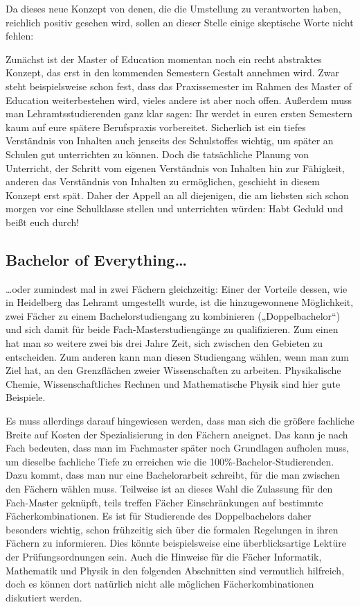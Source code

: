 Da dieses neue Konzept von denen, die die Umstellung zu verantworten haben,
reichlich positiv gesehen wird, sollen an dieser Stelle einige skeptische Worte
nicht fehlen:

Zunächst ist der Master of Education momentan noch ein recht abstraktes
Konzept, das erst in den kommenden Semestern Gestalt annehmen wird. Zwar steht
beispielsweise schon fest, dass das Praxissemester im Rahmen des Master of
Education weiterbestehen wird, vieles andere ist aber noch offen. Außerdem muss
man Lehramtsstudierenden ganz klar sagen: Ihr werdet in euren ersten Semestern
kaum auf eure spätere Berufspraxis vorbereitet. Sicherlich ist ein tiefes
Verständnis von Inhalten auch jenseits des Schulstoffes wichtig, um später an
Schulen gut unterrichten zu können. Doch die tatsächliche Planung von
Unterricht, der Schritt vom eigenen Verständnis von Inhalten hin zur Fähigkeit,
anderen das Verständnis von Inhalten zu ermöglichen, geschieht in diesem
Konzept erst spät. Daher der Appell an all diejenigen, die am liebsten sich
schon morgen vor eine Schulklasse stellen und unterrichten würden: Habt Geduld
und beißt euch durch!

\subsection{Bachelor of Everything\dots}

\dots oder zumindest mal in zwei Fächern gleichzeitig: Einer der Vorteile
dessen, wie in Heidelberg das Lehramt umgestellt wurde, ist die hinzugewonnene
Möglichkeit, zwei Fächer zu einem Bachelorstudiengang zu kombinieren
(„Doppelbachelor“) und sich damit für beide Fach-Mas\-ter\-stu\-di\-en\-gän\-ge
zu qualifizieren. Zum einen hat man so weitere zwei bis drei Jahre Zeit, sich
zwischen den Gebieten zu entscheiden. Zum anderen kann man diesen Studiengang
wählen, wenn man zum Ziel hat, an den Grenzflächen zweier Wissenschaften zu
arbeiten. Physikalische Chemie, Wissenschaftliches Rechnen und Mathematische
Physik sind hier gute Beispiele.

Es muss allerdings darauf hingewiesen werden, dass man sich die größere
fachliche Breite auf Kosten der Spezialisierung in den Fächern aneignet. Das
kann je nach Fach bedeuten, dass man im Fachmaster später noch Grundlagen
aufholen muss, um dieselbe fachliche Tiefe zu erreichen wie die
100\%-Bachelor-Studierenden. Dazu kommt, dass man nur eine Bachelorarbeit
schreibt, für die man zwischen den Fächern wählen muss. Teilweise ist an dieses
Wahl die Zulassung für den Fach-Master geknüpft, teils treffen Fächer
Einschränkungen auf bestimmte Fächerkombinationen. Es ist für Studierende des
Doppelbachelors daher besonders wichtig, schon frühzeitig sich über die
formalen Regelungen in ihren Fächern zu informieren. Dies könnte beispielsweise
eine überblicksartige Lektüre der Prüfungsordnungen sein. Auch die Hinweise für
die Fächer Informatik, Mathematik und Physik in den folgenden Abschnitten sind
vermutlich hilfreich, doch es können dort natürlich nicht alle möglichen
Fächerkombinationen diskutiert werden.


